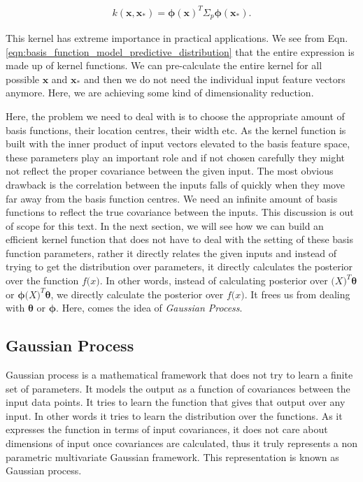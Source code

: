 \documentclass[english]{tktltiki}
\begin{document}
\begin{equation}
\label{eqn:basis_function_model_kernel}
\begin{split}
	k(\mathbf{x}, \mathbf{x_*}) = \boldsymbol\phi(\mathbf{x})^T \Sigma_p \boldsymbol\phi(\mathbf{x_*}).
\end{split}
\end{equation}

This kernel has extreme importance in practical applications. We see from Eqn. \ref{eqn:basis_function_model_predictive_distribution} that the entire expression is made up of kernel functions. We can pre-calculate the entire kernel for all possible $\mathbf{x}$ and $\mathbf{x_*}$ and then we do not need the individual input feature vectors anymore. Here, we are achieving some kind of dimensionality reduction.

Here, the problem we need to deal with is to choose the appropriate amount of basis functions, their location centres, their width etc. As the kernel function is built with the inner product of input vectors elevated to the basis feature space, these parameters play an important role and if not chosen carefully they might not reflect the proper covariance between the given input. The most obvious drawback is the correlation between the inputs falls of quickly when they move far away from the basis function centres. We need an infinite amount of basis functions to reflect the true covariance between the inputs. This discussion is out of scope for this text. In the next section, we will see how we can build an efficient kernel function that does not have to deal with the setting of these basis function parameters, rather it directly relates the given inputs and instead of trying to get the distribution over parameters, it directly calculates the posterior over the function $f\mathbf(x)$. In other words, instead of calculating posterior over $\mathbf(X)^T \boldsymbol\theta$ or $\boldsymbol\phi \mathbf(X)^T \boldsymbol\theta$, we directly calculate the posterior over $f\mathbf(x)$. It frees us from dealing with $\boldsymbol \theta$ or $\boldsymbol \phi$. Here, comes the idea of \textit{Gaussian Process}.

\subsection{Gaussian Process}

Gaussian process \cite{gaussian_process_for_machine_learning} is a mathematical framework that does not try to learn a finite set of parameters. It models the output as a function of covariances between the input data points. It tries to learn the function that gives that output over any input. In other words it tries to learn the distribution over the functions. As it expresses the function in terms of input covariances, it does not care about dimensions of input once covariances are calculated, thus it truly represents a non parametric multivariate Gaussian framework. This representation is known as Gaussian process.
\end{document}
